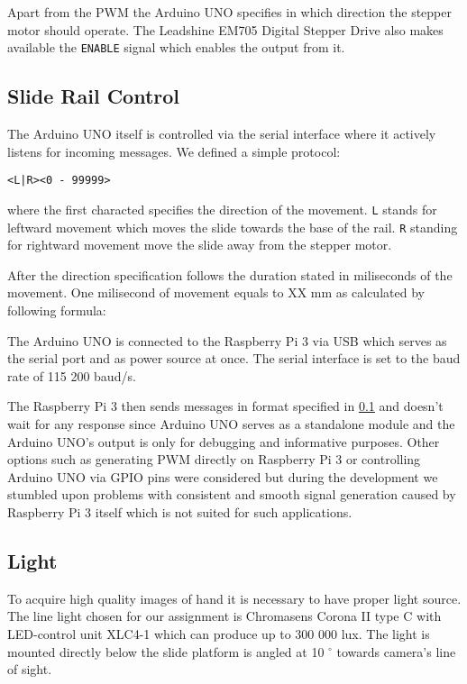 Apart from the PWM the Arduino UNO specifies in which direction the stepper motor should operate. The Leadshine EM705 Digital Stepper Drive also makes available the \texttt{ENABLE} signal which enables the output from it.

\subsection{Slide Rail Control}
\label{sec:serial}
The Arduino UNO itself is controlled via the serial interface where it actively listens for incoming messages. We defined a simple protocol:
\begin{verbatim}
<L|R><0 - 99999>
\end{verbatim}
where the first characted specifies the direction of the movement. \texttt{L} stands for leftward movement which moves the slide towards the base of the rail. \texttt{R} standing for rightward movement move the slide away from the stepper motor.

After the direction specification follows the duration stated in miliseconds of the movement. One milisecond of movement equals to XX mm as calculated by following formula:

The Arduino UNO is connected to the Raspberry Pi 3 via USB which serves as the serial port and as power source at once. The serial interface is set to the baud rate of 115 200 baud/s.

The Raspberry Pi 3 then sends messages in format specified in \ref{sec:serial} and doesn't wait for any response since Arduino UNO serves as a standalone module and the Arduino UNO's output is only for debugging and informative purposes. Other options such as generating PWM directly on Raspberry Pi 3 or controlling Arduino UNO via GPIO pins were considered but during the development we stumbled upon problems with consistent and smooth signal generation caused by Raspberry Pi 3 itself which is not suited for such applications.

\subsection{Light}
To acquire high quality images of hand it is necessary to have proper light source. The line light chosen for our assignment is Chromasens Corona II type C with LED-control unit XLC4-1 which can produce up to 300 000 lux. The light is mounted directly below the slide platform is angled at 10 $^{\circ}$ towards camera's line of sight.

